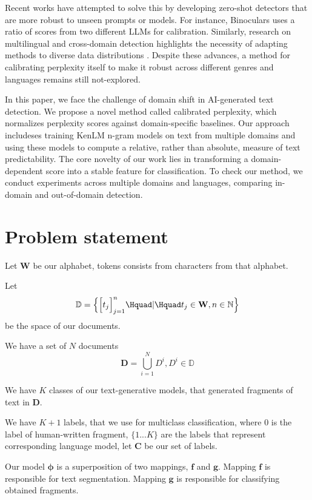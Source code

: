 \documentclass{article}
\begin{document}
Recent works have attempted to solve this by developing zero-shot detectors that are more robust to unseen prompts or models. For instance, Binoculars \cite{hans2024spotting} uses a ratio of scores from two different LLMs for calibration. Similarly, research on multilingual and cross-domain detection highlights the necessity of adapting methods to diverse data distributions \cite{gritsay2023artificially}. Despite these advances, a method for calibrating perplexity itself to make it robust across different genres and languages remains still not-explored.

In this paper, we face the challenge of domain shift in AI-generated text detection. We propose a novel method called calibrated perplexity, which normalizes perplexity scores against domain-specific baselines. Our approach includeses training KenLM n-gram models on text from multiple domains and using these models to compute a relative, rather than absolute, measure of text predictability. The core novelty of our work lies in transforming a domain-dependent score into a stable feature for classification. To check our method, we conduct experiments across multiple domains and languages, comparing in-domain and out-of-domain detection.


\section{Problem statement}

Let $\mathbf{W}$ be our alphabet, tokens consists from characters from that alphabet.

Let $$\mathbb{D} = \Bigl\{\Big[t_j\Big]_{j=1}^n \Hquad|\Hquad t_j \in \mathbf{W}, n \in \mathbb{N}\Bigr\}$$ be the space of our documents.

We have a set of $N$ documents
$$\mathbf{D} = \bigcup_{i=1}^{N}D^i, D^i \in \mathbb{D}$$

We have $K$ classes of our text-generative models, that generated fragments of text in $\mathbf{D}$.

We have $K + 1$ labels, that we use for multiclass classification, where $0$ is the label of human-written fragment, $\{1...K\}$ are the  labels that represent corresponding language model, let $\mathbf{C}$ be our set of labels.

Our model $\mathbf{\phi}$ is a superposition of two mappings, $\mathbf{f}$ and $\mathbf{g}$. Mapping $\mathbf{f}$ is responsible for text segmentation. Mapping $\mathbf{g}$ is responsible for classifying obtained fragments.
\end{document}
